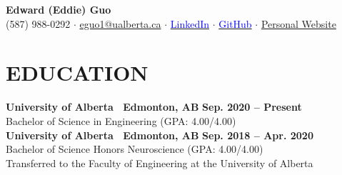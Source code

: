 \documentclass{article}
\begin{document}
\thispagestyle{plain}
\begin{center}
    \LARGE \textbf{\textcolor{my_colour}{Edward (Eddie) Guo}}\\ \vspace{0.25em}
    \normalfont \normalsize (587) 988-0292
        \hspace{.25em} $\boldsymbol{\cdot}$ \hspace{.25em}
    \href{mailto:eguo1@ualberta.ca}{eguo1@ualberta.ca}
        \hspace{.25em} $\boldsymbol{\cdot}$ \hspace{.25em}
    \href{https://www.linkedin.com/in/eguo1}{\textcolor{blue}{LinkedIn}}
        \hspace{.25em} $\boldsymbol{\cdot}$ \hspace{.25em}
    \href{https://github.com/tig3r66}{\textcolor{blue}{GitHub}}
        \hspace{.25em} $\boldsymbol{\cdot}$ \hspace{.25em}
    \href{https://tig3r66.github.io/index.html}{Personal Website}
\end{center}

\section*{\textcolor{my_colour}{EDUCATION}}
\vspace{-.25em} \hrulefill \vspace{.75em}


    \textbf{University of Alberta \textbar\ Edmonton, AB} \hfill \textbf{Sep. 2020 -- Present}\\
    Bachelor of Science in Engineering (GPA: 4.00/4.00)\\

    \textbf{University of Alberta \textbar\ Edmonton, AB} \hfill \textbf{Sep. 2018 -- Apr. 2020}\\
    Bachelor of Science Honors Neuroscience (GPA: 4.00/4.00)\\
    Transferred to the Faculty of Engineering at the University of Alberta
\end{document}
